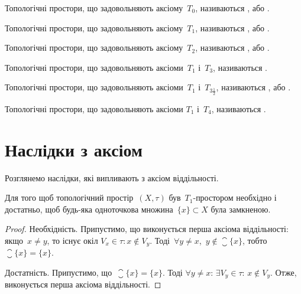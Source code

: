 \begin{definition}[Колмогоров, 1935]
Топологічні простори, що
задовольняють аксіому~$T_0$, називаються ,
або .
\end{definition}

\begin{definition}[Рісс, 1907]
Топологічні простори, що
задовольняють аксіому~$T_1$, називаються ,
або .
\end{definition}

\begin{definition}[Хаусдорф, 1914]
Топологічні простори, що
задовольняють аксіому~$T_2$, називаються ,
або .
\end{definition}

\begin{definition}[В'єторіс, 1921]
Топологічні простори, що
задовольняють аксіоми~$T_1$ і~$T_3$, називаються .
\end{definition}

\begin{definition}[Тихонов, 1930]
Топологічні простори, що
задовольняють аксіоми~$T_1$ і~$T_{3\frac{1}{2}}$, називаються , або .
\end{definition}

\begin{definition}
Топологічні простори, що задовольняють аксіоми
$T_1$ і~$T_4$, називаються .
\end{definition}

\section{Наслідки з аксіом}

Розглянемо наслідки, які випливають з аксіом
віддільності.

\begin{theorem}
Для того щоб
топологічний простір~$(X, \tau)$ був~$T_1$-простором необхідно і
достатньо, щоб будь-яка одноточкова множина~$\{x\} \subset X$
була замкненою.
\end{theorem}

\begin{proof}
Необхідність. Припустимо, що виконується
перша аксіома віддільності: якщо~$x \ne y$, то існує окіл
$V_x \in \tau: x \notin V_y$. Тоді~$\forall y \ne x$,~$y \notin \closure{\{x\}}$,
тобто~$\closure{\{x\}} = \{x\}$.

Достатність. Припустимо, що~$\closure{\{x\}} = \{x\}$. Тоді
$\forall y \ne x$: $\exists V_y \in \tau$: $x \notin V_y$. Отже, виконується перша аксіома
віддільності.
\end{proof}

